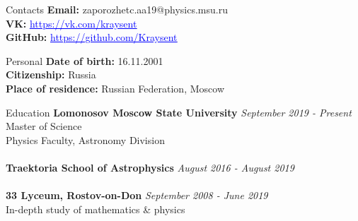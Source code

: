 \documentclass{resume} %
\newcommand{\link}[2]{\href{#1}{\textcolor{blue}{\underline{#2}}}}
\begin{document}
	\begin{rSection}{Contacts}
		\textbf{Email: } zaporozhetc.aa19@physics.msu.ru
		\\ \textbf{VK: } \link{https://vk.com/kraysent}{https://vk.com/kraysent}
		\\ \textbf{GitHub: } \link{https://github.com/Kraysent}{https://github.com/Kraysent}
	\end{rSection}		

	\begin{rSection}{Personal}
		\textbf{Date of birth: } 16.11.2001
		\\ \textbf{Citizenship: } Russia
		\\ \textbf{Place of residence: } Russian Federation, Moscow
	\end{rSection}

	\begin{rSection}{Education}
		\textbf{Lomonosov Moscow State University} \hfill \textit{September 2019 - Present}
		\\ Master of Science
		\\ Physics Faculty, Astronomy Division \\
		\\ \textbf{Traektoria School of Astrophysics} \hfill \textit{August 2016 - August 2019} \\
		\\ \textbf{33 Lyceum, Rostov-on-Don} \hfill \textit{September 2008 - June 2019}
		\\ In-depth study of mathematics \& physics
	\end{rSection}
	
\end{document}
